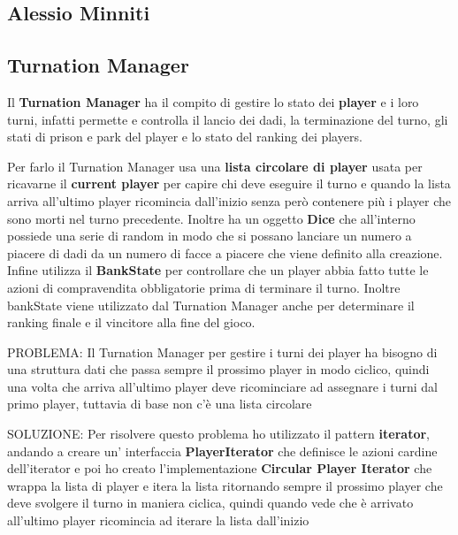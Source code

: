 \subsection{Alessio Minniti}
\subsection{Turnation Manager}
Il \textbf{Turnation Manager} ha il compito di gestire lo stato dei \textbf{player} e i loro turni, 
infatti permette e controlla il lancio dei dadi, la terminazione del turno, gli stati di prison e park del player e lo stato del ranking dei players.


Per farlo il Turnation Manager usa una \textbf{lista circolare di player} usata per ricavarne il \textbf{current player} per capire chi deve eseguire il turno e
quando la lista arriva all'ultimo player ricomincia dall'inizio senza però contenere più i player che sono morti nel turno precedente.
Inoltre ha un oggetto \textbf{Dice} che all'interno possiede una serie di random in modo che si possano lanciare 
un numero a piacere di dadi da un numero di facce a piacere che viene definito alla creazione. 
Infine utilizza il \textbf{BankState} per controllare che un player abbia fatto tutte le azioni di compravendita obbligatorie prima di terminare il turno.
Inoltre bankState viene utilizzato dal Turnation Manager anche per determinare il ranking finale e il vincitore alla fine del gioco.

PROBLEMA:
Il Turnation Manager per gestire i turni dei player ha bisogno di una struttura dati che passa sempre il prossimo player in modo ciclico, 
quindi una volta che arriva all'ultimo player deve ricominciare ad assegnare i turni dal primo player, tuttavia di base non c'è una lista circolare 

SOLUZIONE:
Per risolvere questo problema ho utilizzato il pattern \textbf{iterator}, andando a creare un' interfaccia \textbf{PlayerIterator} che definisce le azioni cardine dell'iterator e poi ho creato l'implementazione \textbf{Circular Player Iterator} che wrappa la lista di player e itera la lista ritornando sempre il prossimo player che deve svolgere il turno in maniera ciclica, quindi quando vede che è arrivato all'ultimo player ricomincia ad iterare la lista dall'inizio